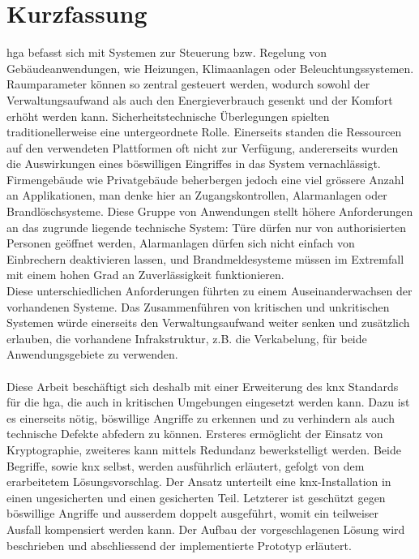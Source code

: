 \chapter*{Kurzfassung}
\gls{hga} befasst sich mit Systemen zur Steuerung bzw. Regelung von Gebäudeanwendungen, wie Heizungen, Klimaanlagen oder Beleuchtungssystemen. Raumparameter
können so zentral gesteuert werden, wodurch sowohl der Verwaltungsaufwand als auch den Energieverbrauch gesenkt und der Komfort erhöht werden kann. 
Sicherheitstechnische Überlegungen spielten traditionellerweise eine untergeordnete Rolle.
Einerseits standen die Ressourcen auf den verwendeten Plattformen oft nicht zur Verfügung, andererseits wurden die Auswirkungen eines böswilligen Eingriffes in das System vernachlässigt.
\\
Firmengebäude wie Privatgebäude beherbergen jedoch eine viel grössere Anzahl an Applikationen, man denke hier an Zugangskontrollen, 
Alarmanlagen oder Brandlöschsysteme. Diese Gruppe von Anwendungen stellt höhere Anforderungen an das zugrunde liegende technische System:
Türe dürfen nur von authorisierten Personen geöffnet werden, Alarmanlagen dürfen sich nicht einfach von Einbrechern deaktivieren lassen, und Brandmeldesysteme müssen im
Extremfall mit einem hohen Grad an Zuverlässigkeit funktionieren. 
\\
Diese unterschiedlichen Anforderungen führten zu einem Auseinanderwachsen der vorhandenen Systeme. Das Zusammenführen 
von kritischen und unkritischen Systemen würde einerseits den Verwaltungsaufwand weiter senken und zusätzlich erlauben, die vorhandene Infrakstruktur, z.B. die Verkabelung,
für beide Anwendungsgebiete zu verwenden.
\\
\\
Diese Arbeit beschäftigt sich deshalb mit einer Erweiterung des \gls{knx} Standards für die \gls{hga}, die auch in kritischen Umgebungen eingesetzt werden kann.
Dazu ist es einerseits nötig, böswillige Angriffe zu erkennen und zu verhindern als auch technische Defekte abfedern zu können. Ersteres ermöglicht der Einsatz von Kryptographie,
zweiteres kann mittels Redundanz bewerkstelligt werden. Beide Begriffe, sowie \gls{knx} selbst, werden ausführlich erläutert, gefolgt von dem erarbeitetem Lösungsvorschlag.
Der Ansatz unterteilt eine \gls{knx}-Installation in einen ungesicherten und einen gesicherten Teil. Letzterer ist geschützt gegen böswillige Angriffe und ausserdem doppelt ausgeführt,
womit ein teilweiser Ausfall kompensiert werden kann. Der Aufbau der vorgeschlagenen Lösung wird beschrieben und abschliessend der implementierte Prototyp erläutert. 
